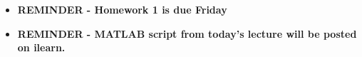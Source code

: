 \documentclass[11pt]{article}
\begin{document}
\begin{itemize}
\begin{itemize}
		
\end{itemize}

\newpage 

	\item \textbf{ \LARGE REMINDER - Homework 1 is due Friday } \\
	 
	\item \textbf{ \LARGE REMINDER - MATLAB script from today's lecture will be posted on ilearn. } \\

\end{itemize}


	
\end{document}

